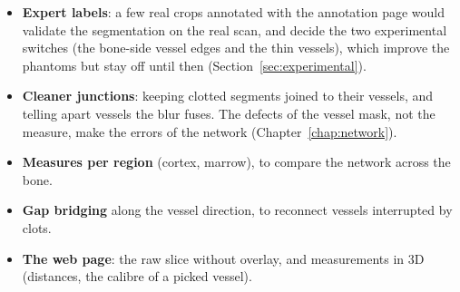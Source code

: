 \begin{itemize}
  \item \textbf{Expert labels}: a few real crops annotated with the annotation page would validate
        the segmentation on the real scan, and decide the two experimental switches (the bone-side
        vessel edges and the thin vessels), which improve the phantoms but stay off until then
        (Section~\ref{sec:experimental}).
  \item \textbf{Cleaner junctions}: keeping clotted segments joined to their vessels, and telling
        apart vessels the blur fuses. The defects of the vessel mask,
        not the measure, make the errors of the network (Chapter~\ref{chap:network}).
  \item \textbf{Measures per region} (cortex, marrow), to compare the network across the bone.
  \item \textbf{Gap bridging} along the vessel direction, to reconnect vessels interrupted by clots.
  \item \textbf{The web page}: the raw slice without overlay, and measurements in 3D (distances,
        the calibre of a picked vessel).
\end{itemize}
